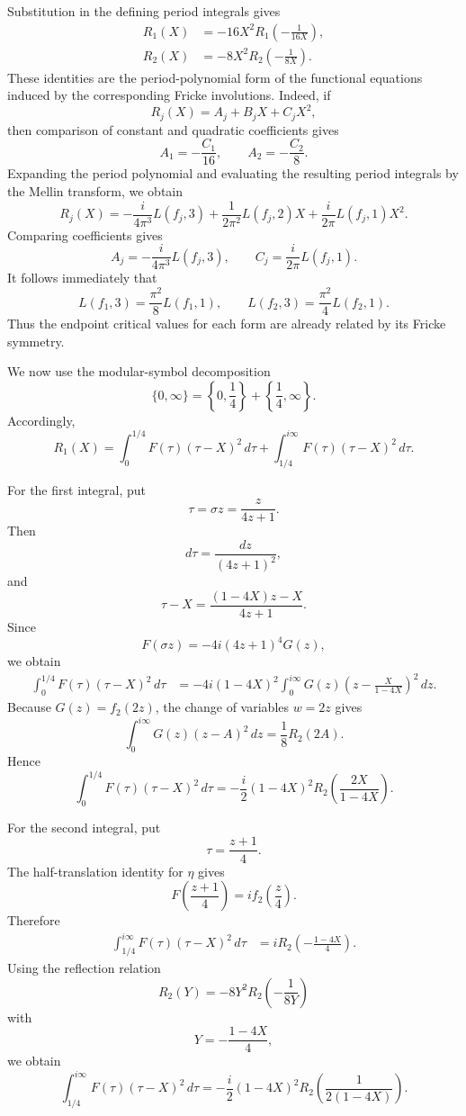 \documentclass[preprint,12pt]{elsarticle}
\theoremstyle{definition}
\theoremstyle{remark}
\begin{document}
	Substitution in the defining period integrals gives
	\begin{align}
		R_1(X)&=-16X^2R_1\left(-\frac{1}{16X}\right),
		\label{eq:R1-Fricke}\\
		R_2(X)&=-8X^2R_2\left(-\frac{1}{8X}\right).
		\label{eq:R2-Fricke}
	\end{align}
	These identities are the period-polynomial form of the functional equations induced by the corresponding Fricke involutions.  Indeed, if
	\[
	R_j(X)=A_j+B_jX+C_jX^2,
	\]
	then comparison of constant and quadratic coefficients gives
	\[
	A_1=-\frac{C_1}{16},
	\qquad
	A_2=-\frac{C_2}{8}.
	\]
Expanding the period polynomial and evaluating the resulting period integrals by the Mellin transform, we obtain
\begin{equation}\label{eq:mellin-Rj}
	R_j(X)=-\frac{i}{4\pi^3}L(f_j,3)
	+\frac{1}{2\pi^2}L(f_j,2)X+\frac{i}{2\pi}L(f_j,1)X^2.
\end{equation}
Comparing coefficients gives
\[
A_j=-\frac{i}{4\pi^3}L(f_j,3),
\qquad
C_j=\frac{i}{2\pi}L(f_j,1).
\]
	It follows immediately that
	\[
	L(f_1,3)=\frac{\pi^2}{8}L(f_1,1),
	\qquad
	L(f_2,3)=\frac{\pi^2}{4}L(f_2,1).
	\]
	Thus the endpoint critical values for each form are already related by its Fricke symmetry.
	

	
	We now use the modular-symbol decomposition
	\[
	\{0,\infty\}
	=
	\left\{0,\frac14\right\}
	+
	\left\{\frac14,\infty\right\}.
	\]
	Accordingly,
	\[
	R_1(X)
	=
	\int_0^{1/4}F(\tau)(\tau-X)^2\,d\tau
	+
	\int_{1/4}^{i\infty}F(\tau)(\tau-X)^2\,d\tau.
	\]
	
	For the first integral, put
	\[
	\tau=\sigma z=\frac{z}{4z+1}.
	\]
	Then
	\[
	d\tau=\frac{dz}{(4z+1)^2},
	\]
	and
	\[
	\tau-X
	=
	\frac{(1-4X)z-X}{4z+1}.
	\]
	Since
	\[
	F(\sigma z)=-4i(4z+1)^4G(z),
	\]
	we obtain
	\[
	\begin{aligned}
		\int_0^{1/4}F(\tau)(\tau-X)^2\,d\tau
		&=
		-4i(1-4X)^2
		\int_0^{i\infty}
		G(z)
		\left(z-\frac{X}{1-4X}\right)^2\,dz.
	\end{aligned}
	\]
	Because $G(z)=f_2(2z)$, the change of variables $w=2z$ gives
	\[
	\int_0^{i\infty}G(z)(z-A)^2\,dz
	=
	\frac18R_2(2A).
	\]
	Hence
	\[
	\int_0^{1/4}F(\tau)(\tau-X)^2\,d\tau
	=
	-\frac{i}{2}(1-4X)^2
	R_2\left(\frac{2X}{1-4X}\right).
	\]
	
	For the second integral, put
	\[
	\tau=\frac{z+1}{4}.
	\]
	The half-translation identity for $\eta$ gives
	\[
	F\left(\frac{z+1}{4}\right)
	=
	if_2\left(\frac z4\right).
	\]
	Therefore
	\[
	\begin{aligned}
		\int_{1/4}^{i\infty}F(\tau)(\tau-X)^2\,d\tau
		&=
		iR_2\left(-\frac{1-4X}{4}\right).
	\end{aligned}
	\]
	Using the reflection relation
	\[
	R_2(Y)=-8Y^2R_2\left(-\frac{1}{8Y}\right)
	\]
	with
	\[
	Y=-\frac{1-4X}{4},
	\]
	we obtain
	\[
	\int_{1/4}^{i\infty}F(\tau)(\tau-X)^2\,d\tau
	=
	-\frac{i}{2}(1-4X)^2
	R_2\left(\frac{1}{2(1-4X)}\right).
	\]
	
\end{document}

